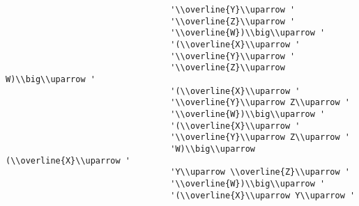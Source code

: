 \begin{verbatim}
                                 '\\overline{Y}\\uparrow '
                                 '\\overline{Z}\\uparrow '
                                 '\\overline{W})\\big\\uparrow '
                                 '(\\overline{X}\\uparrow '
                                 '\\overline{Y}\\uparrow '
                                 '\\overline{Z}\\uparrow W)\\big\\uparrow '
                                 '(\\overline{X}\\uparrow '
                                 '\\overline{Y}\\uparrow Z\\uparrow '
                                 '\\overline{W})\\big\\uparrow '
                                 '(\\overline{X}\\uparrow '
                                 '\\overline{Y}\\uparrow Z\\uparrow '
                                 'W)\\big\\uparrow (\\overline{X}\\uparrow '
                                 'Y\\uparrow \\overline{Z}\\uparrow '
                                 '\\overline{W})\\big\\uparrow '
                                 '(\\overline{X}\\uparrow Y\\uparrow '

\end{verbatim}
